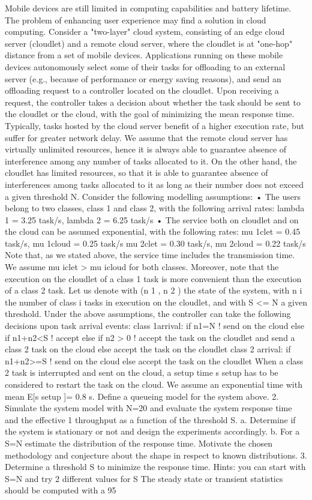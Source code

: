 Mobile devices are still limited in computing capabilities and battery lifetime. The problem of enhancing user
experience may find a solution in cloud computing.
Consider a "two-layer" cloud system, consisting of an edge cloud server (cloudlet) and a remote cloud server, where
the cloudlet is at "one-hop" distance from a set of mobile devices. Applications running on these mobile devices
autonomously select some of their tasks for offloading to an external server (e.g., because of performance or energy
saving reasons), and send an offloading request to a controller located on the cloudlet. Upon receiving a request, the
controller takes a decision about whether the task should be sent to the cloudlet or the cloud, with the goal of
minimizing the mean response time.
Typically, tasks hosted by the cloud server benefit of a higher execution rate, but suffer for greater network delay.
We assume that the remote cloud server has virtually unlimited resources, hence it is always able to guarantee
absence of interference among any number of tasks allocated to it. On the other hand, the cloudlet has limited
resources, so that it is able to guarantee absence of interferences among tasks allocated to it as long as their number
does not exceed a given threshold N.
%
Consider the following modelling assumptions:
• The users belong to two classes, class 1 and class 2, with the following arrival rates:
lambda 1 = 3.25 task/s, lambda 2 = 6.25 task/s
• The service both on cloudlet and on the cloud can be assumed exponential, with the following rates:
mu 1clet = 0.45 task/s, mu 1cloud = 0.25 task/s
mu 2clet = 0.30 task/s, mu 2cloud = 0.22 task/s
Note that, as we stated above, the service time includes the transmission time. We assume mu iclet > mu icloud for both
classes. Moreover, note that the execution on the cloudlet of a class 1 task is more convenient than the execution of a
class 2 task.
Let us denote with (n 1 , n 2 ) the state of the system, with n i the number of class i tasks in execution on the cloudlet, and
with S <= N a given threshold. Under the above assumptions, the controller can take the following decisions upon task
arrival events:
%
class 1arrival:
if n1=N ! send on the cloud
else if n1+n2<S ! accept
else if n2 > 0 ! accept the task on the cloudlet and send a class 2 task on the cloud
else accept the task on the cloudlet
class 2 arrival:
if n1+n2>=S ! send on the cloud
else accept the task on the cloudlet
%
When a class 2 task is interrupted and sent on the cloud, a setup time s setup has to be considered to restart the task on
the cloud. We assume an exponential time with mean E[s setup ]= 0.8 s.
Define a queueing model for the system above.
2. Simulate the system model with N=20 and evaluate the system response time and the effective 1 throughput
as a function of the threshold S.
a. Determine if the system is stationary or not and design the experiments accordingly.
b. For a S=N estimate the distribution of the response time. Motivate the chosen methodology and
conjecture about the shape in respect to known distributions.
3. Determine a threshold S to minimize the response time. Hints: you can start with S=N and try 2 different
values for S
The steady state or transient statistics should be computed with a 95%




